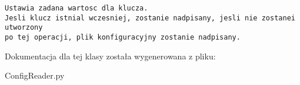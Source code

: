 \footnotesize\begin{verbatim}Ustawia zadana wartosc dla klucza.
Jesli klucz istnial wczesniej, zostanie nadpisany, jesli nie zostanei utworzony
po tej operacji, plik konfiguracyjny zostanie nadpisany.        
\end{verbatim}
\normalsize
 

Dokumentacja dla tej klasy została wygenerowana z pliku:\begin{CompactItemize}
\item 
ConfigReader.py\end{CompactItemize}
